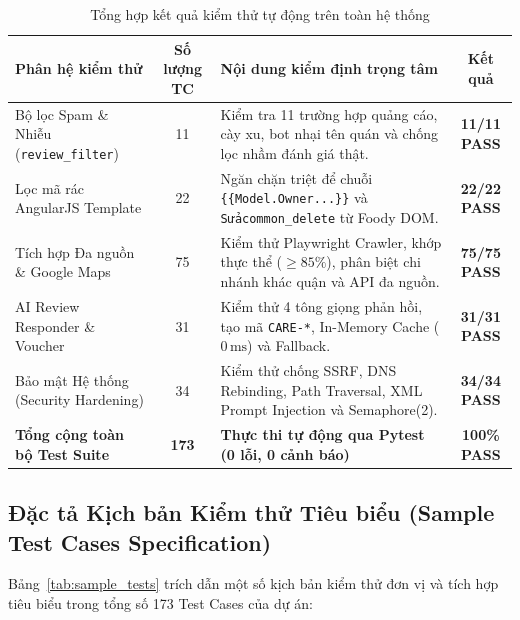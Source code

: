 \documentclass[12pt, a4paper]{article}
\begin{document}
\begin{table}[H]
\centering
\caption{Tổng hợp kết quả kiểm thử tự động trên toàn hệ thống}
\label{tab:test_summary}
\vspace{0.15cm}
\footnotesize
\begin{tabularx}{\textwidth}{l c X c}
\toprule
\rowcolor{blue!8}
\textbf{Phân hệ kiểm thử} & \textbf{Số lượng TC} & \textbf{Nội dung kiểm định trọng tâm} & \textbf{Kết quả} \\
\midrule
Bộ lọc Spam \& Nhiễu (\texttt{review\_filter}) & 11 & Kiểm tra 11 trường hợp quảng cáo, cày xu, bot nhại tên quán và chống lọc nhầm đánh giá thật. & \textbf{11/11 PASS} \\
\addlinespace
Lọc mã rác AngularJS Template & 22 & Ngăn chặn triệt để chuỗi \texttt{\{\{Model.Owner...\}\}} và \texttt{Sửacommon\_delete} từ Foody DOM. & \textbf{22/22 PASS} \\
\addlinespace
Tích hợp Đa nguồn \& Google Maps & 75 & Kiểm thử Playwright Crawler, khớp thực thể ($\ge 85\%$), phân biệt chi nhánh khác quận và API đa nguồn. & \textbf{75/75 PASS} \\
\addlinespace
AI Review Responder \& Voucher & 31 & Kiểm thử 4 tông giọng phản hồi, tạo mã \texttt{CARE-*}, In-Memory Cache ($0\,\mathrm{ms}$) và Fallback. & \textbf{31/31 PASS} \\
\addlinespace
Bảo mật Hệ thống (Security Hardening) & 34 & Kiểm thử chống SSRF, DNS Rebinding, Path Traversal, XML Prompt Injection và Semaphore(2). & \textbf{34/34 PASS} \\
\midrule
\rowcolor{blue!8}
\textbf{Tổng cộng toàn bộ Test Suite} & \textbf{173} & \textbf{Thực thi tự động qua Pytest (0 lỗi, 0 cảnh báo)} & \textbf{100\% PASS} \\
\bottomrule
\end{tabularx}
\end{table}

\subsection{Đặc tả Kịch bản Kiểm thử Tiêu biểu (Sample Test Cases Specification)}
Bảng~\ref{tab:sample_tests} trích dẫn một số kịch bản kiểm thử đơn vị và tích hợp tiêu biểu trong tổng số 173 Test Cases của dự án:
\end{document}
